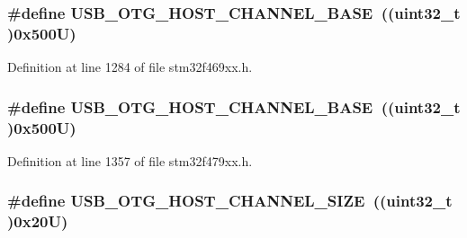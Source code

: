 \subsubsection[{\texorpdfstring{U\+S\+B\+\_\+\+O\+T\+G\+\_\+\+H\+O\+S\+T\+\_\+\+C\+H\+A\+N\+N\+E\+L\+\_\+\+B\+A\+SE}{USB_OTG_HOST_CHANNEL_BASE}}]{\setlength{\rightskip}{0pt plus 5cm}\#define U\+S\+B\+\_\+\+O\+T\+G\+\_\+\+H\+O\+S\+T\+\_\+\+C\+H\+A\+N\+N\+E\+L\+\_\+\+B\+A\+SE~((uint32\+\_\+t )0x500\+U)}\hypertarget{group___peripheral__memory__map_ga942c8c5241b80fbcf638fea0fa18bebd}{}\label{group___peripheral__memory__map_ga942c8c5241b80fbcf638fea0fa18bebd}


Definition at line 1284 of file stm32f469xx.\+h.

\subsubsection[{\texorpdfstring{U\+S\+B\+\_\+\+O\+T\+G\+\_\+\+H\+O\+S\+T\+\_\+\+C\+H\+A\+N\+N\+E\+L\+\_\+\+B\+A\+SE}{USB_OTG_HOST_CHANNEL_BASE}}]{\setlength{\rightskip}{0pt plus 5cm}\#define U\+S\+B\+\_\+\+O\+T\+G\+\_\+\+H\+O\+S\+T\+\_\+\+C\+H\+A\+N\+N\+E\+L\+\_\+\+B\+A\+SE~((uint32\+\_\+t )0x500\+U)}\hypertarget{group___peripheral__memory__map_ga942c8c5241b80fbcf638fea0fa18bebd}{}\label{group___peripheral__memory__map_ga942c8c5241b80fbcf638fea0fa18bebd}


Definition at line 1357 of file stm32f479xx.\+h.

\subsubsection[{\texorpdfstring{U\+S\+B\+\_\+\+O\+T\+G\+\_\+\+H\+O\+S\+T\+\_\+\+C\+H\+A\+N\+N\+E\+L\+\_\+\+S\+I\+ZE}{USB_OTG_HOST_CHANNEL_SIZE}}]{\setlength{\rightskip}{0pt plus 5cm}\#define U\+S\+B\+\_\+\+O\+T\+G\+\_\+\+H\+O\+S\+T\+\_\+\+C\+H\+A\+N\+N\+E\+L\+\_\+\+S\+I\+ZE~((uint32\+\_\+t )0x20\+U)}\hypertarget{group___peripheral__memory__map_ga266cb1dbb50faf447f9c15d2ee93a522}{}\label{group___peripheral__memory__map_ga266cb1dbb50faf447f9c15d2ee93a522}


